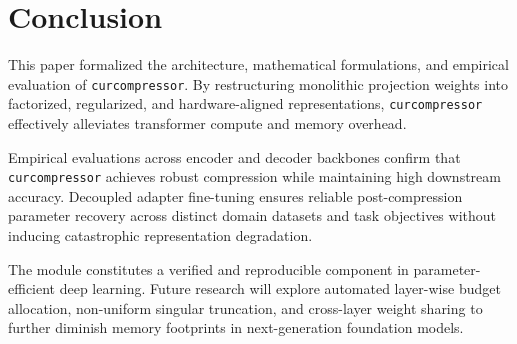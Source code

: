 \section{Conclusion}
This paper formalized the architecture, mathematical formulations, and empirical evaluation of \texttt{curcompressor}. By restructuring monolithic projection weights into factorized, regularized, and hardware-aligned representations, \texttt{curcompressor} effectively alleviates transformer compute and memory overhead.

Empirical evaluations across encoder and decoder backbones confirm that \texttt{curcompressor} achieves robust compression while maintaining high downstream accuracy. Decoupled adapter fine-tuning ensures reliable post-compression parameter recovery across distinct domain datasets and task objectives without inducing catastrophic representation degradation.

The module constitutes a verified and reproducible component in parameter-efficient deep learning. Future research will explore automated layer-wise budget allocation, non-uniform singular truncation, and cross-layer weight sharing to further diminish memory footprints in next-generation foundation models.
